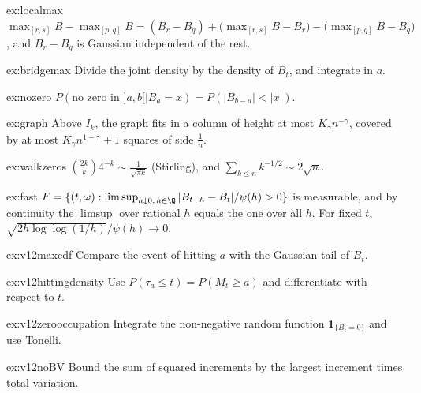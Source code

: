 \begin{hint}{ex:localmax}
$\max_{[r,s]}B-\max_{[p,q]}B=(B_r-B_q)+\bigl(\max_{[r,s]}B-B_r\bigr)-\bigl(\max_{[p,q]}B-B_q\bigr)$, and $B_r-B_q$ is Gaussian independent of the rest.
\end{hint}

\begin{hint}{ex:bridgemax}
Divide the joint density by the density of $B_t$, and integrate in $a$.
\end{hint}

\begin{hint}{ex:nozero}
$P(\text{no zero in }]a,b[\mid B_a=x)=P(|B_{b-a}|<|x|)$.
\end{hint}

\begin{hint}{ex:graph}
Above $I_k$, the graph fits in a column of height at most $K_\gamma n^{-\gamma}$, covered by at most $K_\gamma n^{1-\gamma}+1$ squares of side $\frac1n$.
\end{hint}

\begin{hint}{ex:walkzeros}
$\binom{2k}k4^{-k}\sim\frac1{\sqrt{\pi k}}$ (Stirling), and $\sum_{k\le n}k^{-1/2}\sim2\sqrt n$.
\end{hint}

\begin{hint}{ex:fast}
$F=\{(t,\omega):\limsup_{h\downarrow0,\,h\in\Q}|B_{t+h}-B_t|/\psi(h)>0\}$ is measurable, and by continuity the $\limsup$ over rational $h$ equals the one over all $h$. For fixed $t$, $\sqrt{2h\log\log(1/h)}/\psi(h)\to0$.
\end{hint}

\begin{hint}{ex:v12maxcdf}
Compare the event of hitting $a$ with the Gaussian tail of $B_t$.
\end{hint}

\begin{hint}{ex:v12hittingdensity}
Use $P(\tau_a\le t)=P(M_t\ge a)$ and differentiate with respect to $t$.
\end{hint}

\begin{hint}{ex:v12zerooccupation}
Integrate the non-negative random function $\mathbf1_{\{B_t=0\}}$ and use Tonelli.
\end{hint}

\begin{hint}{ex:v12noBV}
Bound the sum of squared increments by the largest increment times total variation.
\end{hint}

